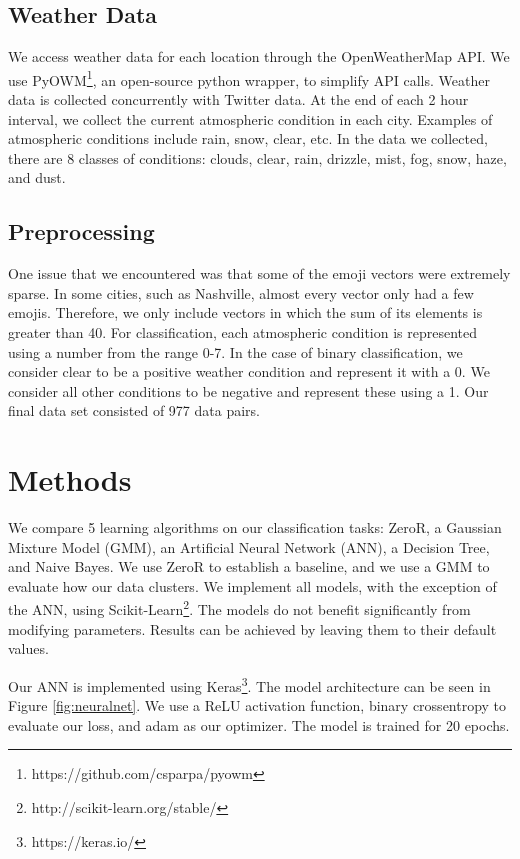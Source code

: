 \documentclass[12pt]{article}
\begin{document}
\subsection{Weather Data}
We access weather data for each location through the OpenWeatherMap API. We use PyOWM\footnote{https://github.com/csparpa/pyowm}, an open-source python wrapper, to simplify API calls. Weather data is collected concurrently with Twitter data. At the end of each 2 hour interval, we collect the current atmospheric condition in each city. Examples of atmospheric conditions include rain, snow, clear, etc. In the data we collected, there are 8 classes of conditions: clouds, clear, rain, drizzle, mist, fog, snow, haze, and dust.

\subsection{Preprocessing}\label{preprocessing}
One issue that we encountered was that some of the emoji vectors were extremely sparse. In some cities, such as Nashville, almost every vector only had a few emojis. Therefore, we only include vectors in which the sum of its elements is greater than 40. For classification, each atmospheric condition is represented using a number from the range 0-7. In the case of binary classification, we consider clear to be a positive weather condition and represent it with a 0. We consider all other conditions to be negative and represent these using a 1. Our final data set consisted of 977 data pairs.

\section{Methods}
We compare 5 learning algorithms on our classification tasks: ZeroR, a Gaussian Mixture Model (GMM), an Artificial Neural Network (ANN), a Decision Tree, and Naive Bayes. We use ZeroR to establish a baseline, and we use a GMM to evaluate how our data clusters. We implement all models, with the exception of the ANN, using Scikit-Learn\footnote{http://scikit-learn.org/stable/}. The models do not benefit significantly from modifying parameters. Results can be achieved by leaving them to their default values.

Our ANN is implemented using Keras\footnote{https://keras.io/}. The model architecture can be seen in Figure \ref{fig:neuralnet}. We use a ReLU activation function, binary crossentropy to evaluate our loss, and adam as our optimizer\cite{Nair2010}\cite{Kingma2015}. The model is trained for 20 epochs.
\end{document}
